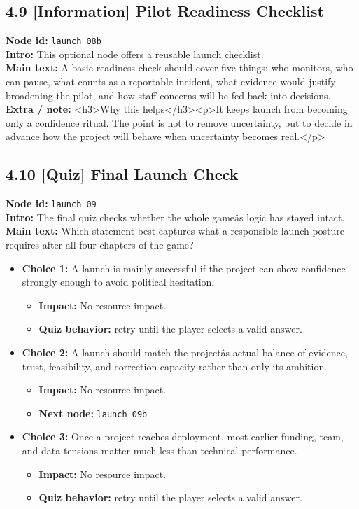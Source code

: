 \documentclass[11pt]{article}
\begin{document}
\subsection*{4.9 [Information] Pilot Readiness Checklist}
\textbf{Node id:} \texttt{launch\_08b}\\
\textbf{Intro:} This optional node offers a reusable launch checklist.\\
\textbf{Main text:} A basic readiness check should cover five things: who monitors, who can pause, what counts as a reportable incident, what evidence would justify broadening the pilot, and how staff concerns will be fed back into decisions.\\
\textbf{Extra / note:} <h3>Why this helps</h3><p>It keeps launch from becoming only a confidence ritual. The point is not to remove uncertainty, but to decide in advance how the project will behave when uncertainty becomes real.</p>\\
\subsection*{4.10 [Quiz] Final Launch Check}
\textbf{Node id:} \texttt{launch\_09}\\
\textbf{Intro:} The final quiz checks whether the whole gameâs logic has stayed intact.\\
\textbf{Main text:} Which statement best captures what a responsible launch posture requires after all four chapters of the game?\\
\begin{itemize}
\item \textbf{Choice 1:} A launch is mainly successful if the project can show confidence strongly enough to avoid political hesitation.
\begin{itemize}
\item \textbf{Impact:} No resource impact.
\item \textbf{Quiz behavior:} retry until the player selects a valid answer.
\end{itemize}
\item \textbf{Choice 2:} A launch should match the projectâs actual balance of evidence, trust, feasibility, and correction capacity rather than only its ambition.
\begin{itemize}
\item \textbf{Impact:} No resource impact.
\item \textbf{Next node:} \texttt{launch\_09b}
\end{itemize}
\item \textbf{Choice 3:} Once a project reaches deployment, most earlier funding, team, and data tensions matter much less than technical performance.
\begin{itemize}
\item \textbf{Impact:} No resource impact.
\item \textbf{Quiz behavior:} retry until the player selects a valid answer.
\end{itemize}
\end{itemize}
\end{document}
